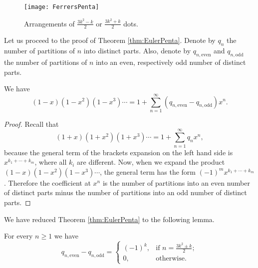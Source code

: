\begin{page}
\begin{figure}[ht]
\begin{center}
\texttt{[image: FerrersPenta]}
\end{center}
\caption{Arrangements of $\frac{3k^2 - k}{2}$ or $\frac{3k^2 + k}{2}$ dots.}
\label{fig:FerrersPenta}
\end{figure}


Let us proceed to the proof of Theorem \ref{thm:EulerPenta}.
Denote by $q_n$ the number of partitions of $n$ into distinct parts.
Also, denote by $q_{n,\mathrm{even}}$ and $q_{n,\mathrm{odd}}$ the number of partitions of $n$ into an even,
respectively odd number of distinct parts.


\end{page}

\begin{page}
\setcounter{section}{3}
\setcounter{subsection}{8}
\setcounter{dfn}{21}
\label{portion:955}

\begin{lem}
We have
\[
(1-x)(1-x^2)(1-x^3) \cdots = 1 + \sum_{n=1}^\infty (q_{n,\mathrm{even}} - q_{n,\mathrm{odd}})x^n.
\]
\end{lem}

\end{page}

\begin{page}
\setcounter{section}{3}
\setcounter{subsection}{8}
\setcounter{dfn}{21}
\label{portion:956}

\begin{proof}
Recall that
\[
(1+x)(1+x^2)(1+x^3) \cdots = 1 + \sum_{n=1}^\infty q_n x^n,
\]
because the general term of the brackets expansion on the left hand side is $x^{k_1 + \cdots + k_m}$, where all $k_i$ are different.
Now, when we expand the product $(1-x)(1-x^2)(1-x^3)\cdots$, the general term has the form $(-1)^m x^{k_1 + \cdots + k_m}$.
Therefore the coefficient at $x^n$ is the number of partitions into an even number of distinct parts
minus the number of partitions into an odd number of distinct parts.
\end{proof}

We have reduced Theorem \ref{thm:EulerPenta} to the following lemma.

\end{page}

\begin{page}
\setcounter{section}{3}
\setcounter{subsection}{8}
\setcounter{dfn}{22}
\label{portion:958}

\begin{lem}
For every $n \ge 1$ we have
\[
q_{n,\mathrm{even}} - q_{n, \mathrm{odd}} =
\begin{cases}
(-1)^k, &\text{if } n = \frac{3k^2 \pm k}2;\\
0, &\text{otherwise.}
\end{cases}
\]
\end{lem}

\end{page}


